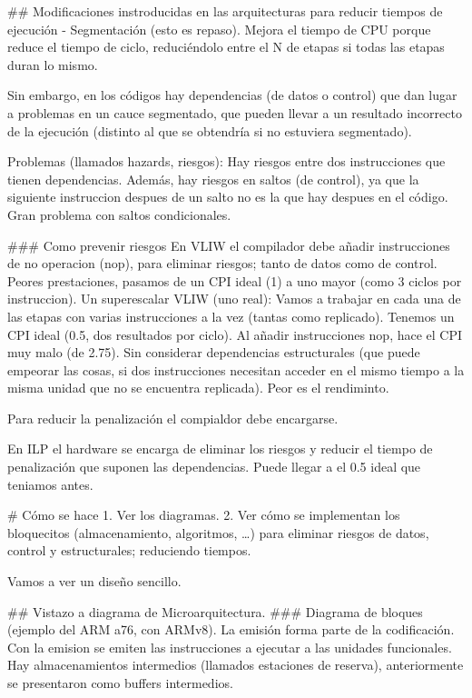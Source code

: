 ## Modificaciones instroducidas en las arquitecturas para reducir tiempos de ejecución
- Segmentación (esto es repaso). Mejora el tiempo de CPU porque reduce el tiempo de ciclo, reduciéndolo entre el N de etapas si todas las etapas duran lo mismo.

Sin embargo, en los códigos hay dependencias (de datos o control) que dan lugar a problemas en un cauce segmentado, que pueden llevar a un resultado incorrecto de la ejecución (distinto al que se obtendría si no estuviera segmentado).

Problemas (llamados hazards, riesgos): Hay riesgos entre dos instrucciones que tienen dependencias. Además, hay riesgos en saltos (de control), ya que la siguiente instruccion despues de un salto no es la que hay despues en el código. Gran problema con saltos condicionales.

### Como prevenir riesgos 
En VLIW el compilador debe añadir instrucciones de no operacion (nop), para eliminar riesgos; tanto de datos como de control. Peores prestaciones, pasamos de un CPI ideal (1) a uno mayor (como 3 ciclos por instruccion).
Un superescalar VLIW (uno real): Vamos a trabajar en cada una de las etapas con varias instrucciones a la vez (tantas como replicado). Tenemos un CPI ideal (0.5, dos resultados por ciclo). Al añadir instrucciones nop, hace el CPI muy malo (de 2.75). Sin considerar dependencias estructurales (que puede empeorar las cosas, si dos instrucciones necesitan acceder en el mismo tiempo a la misma unidad que no se encuentra replicada). Peor es el rendiminto.

Para reducir la penalización el compialdor debe encargarse.

En ILP el hardware se encarga de eliminar los riesgos y reducir el tiempo de penalización que suponen las dependencias. Puede llegar a el 0.5 ideal que teniamos antes.

# Cómo se hace
1. Ver los diagramas.
2. Ver cómo se implementan los bloquecitos (almacenamiento, algoritmos, \ldots) para eliminar riesgos de datos, control y estructurales; reduciendo tiempos.

Vamos a ver un diseño sencillo.

## Vistazo a diagrama de Microarquitectura.
### Diagrama de bloques (ejemplo del ARM a76, con ARMv8).
La emisión forma parte de la codificación. Con la emision se emiten las instrucciones a ejecutar a las unidades funcionales. 
Hay almacenamientos intermedios (llamados estaciones de reserva), anteriormente se presentaron como buffers intermedios.

